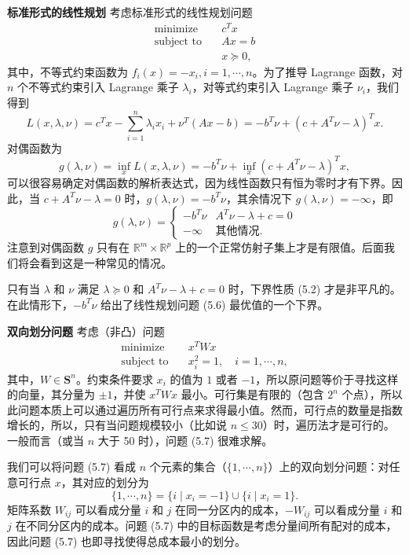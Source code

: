 \documentclass[UTF8,12pt,a4paper,fontset=fandol]{ctexart}
\begin{document}
\noindent\textbf{标准形式的线性规划}\quad
考虑标准形式的线性规划问题
\begin{equation}
\begin{aligned}
\text{minimize}\quad & c^T x\\
\text{subject to}\quad & Ax=b\\
& x\succeq 0,
\end{aligned}
\tag{5.6}
\end{equation}
其中，不等式约束函数为 $f_i(x)=-x_i,i=1,\cdots,n$。为了推导 Lagrange 函数，对 $n$ 个不等式约束引入 Lagrange 乘子 $\lambda_i$，对等式约束引入 Lagrange 乘子 $\nu_i$，我们得到
\[
L(x,\lambda,\nu)=c^Tx-\sum_{i=1}^n \lambda_i x_i+\nu^T(Ax-b)
=-b^T\nu+(c+A^T\nu-\lambda)^T x.
\]
对偶函数为
\[
g(\lambda,\nu)=\inf_x L(x,\lambda,\nu)=-b^T\nu+\inf_x(c+A^T\nu-\lambda)^Tx,
\]
可以很容易确定对偶函数的解析表达式，因为线性函数只有恒为零时才有下界。因此，当 $c+A^T\nu-\lambda=0$ 时，$g(\lambda,\nu)=-b^T\nu$，其余情况下 $g(\lambda,\nu)=-\infty$，即
\[
g(\lambda,\nu)=
\begin{cases}
-b^T\nu & A^T\nu-\lambda+c=0\\
-\infty & \text{其他情况}.
\end{cases}
\]
注意到对偶函数 $g$ 只有在 $\mathbb{R}^m\times\mathbb{R}^p$ 上的一个正常仿射子集上才是有限值。后面我们将会看到这是一种常见的情况。

只有当 $\lambda$ 和 $\nu$ 满足 $\lambda\succeq 0$ 和 $A^T\nu-\lambda+c=0$ 时，下界性质 (5.2) 才是非平凡的。在此情形下，$-b^T\nu$ 给出了线性规划问题 (5.6) 最优值的一个下界。

\noindent\textbf{双向划分问题}\quad
考虑（非凸）问题
\begin{equation}
\begin{aligned}
\text{minimize}\quad & x^T W x\\
\text{subject to}\quad & x_i^2=1,\quad i=1,\cdots,n,
\end{aligned}
\tag{5.7}
\end{equation}
其中，$W\in\mathbf{S}^n$。约束条件要求 $x_i$ 的值为 $1$ 或者 $-1$，所以原问题等价于寻找这样的向量，其分量为 $\pm 1$，并使 $x^TWx$ 最小。可行集是有限的（包含 $2^n$ 个点），所以此问题本质上可以通过遍历所有可行点来求得最小值。然而，可行点的数量是指数增长的，所以，只有当问题规模较小（比如说 $n\leq 30$）时，遍历法才是可行的。一般而言（或当 $n$ 大于 50 时），问题 (5.7) 很难求解。

我们可以将问题 (5.7) 看成 $n$ 个元素的集合（$\{1,\cdots,n\}$）上的双向划分问题：对任意可行点 $x$，其对应的划分为
\[
\{1,\cdots,n\}=\{i\mid x_i=-1\}\cup\{i\mid x_i=1\}.
\]
矩阵系数 $W_{ij}$ 可以看成分量 $i$ 和 $j$ 在同一分区内的成本，$-W_{ij}$ 可以看成分量 $i$ 和 $j$ 在不同分区内的成本。问题 (5.7) 中的目标函数是考虑分量间所有配对的成本，因此问题 (5.7) 也即寻找使得总成本最小的划分。
\end{document}

